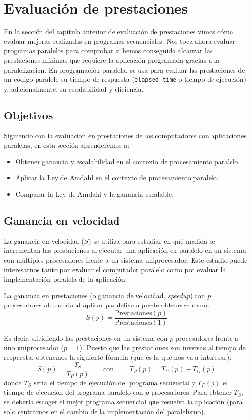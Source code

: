 \newpage
\section{Evaluación de prestaciones}
En la sección del capítulo anterior de evaluación de prestaciones vimos cómo evaluar mejoras realizadas en programas secuenciales. Nos toca ahora evaluar programas paralelos para comprobar si hemos conseguido alcanzar las prestaciones mínimas que requiere la aplicación programada gracias a la paralelización. En programación paralela, se usa para evaluar las prestaciones de un código paralelo su tiempo de respuesta (\verb|elapsed time| o tiempo de ejecución) y, adicionalmente, su escalabilidad y eficiencia.

\subsection{Objetivos}
Siguiendo con la evaluación en prestaciones de los computadores con aplicaciones paralelas, en esta sección aprenderemos a:
\begin{itemize}
    \item Obtener ganancia y escalabilidad en el contexto de procesamiento paralelo.
    \item Aplicar la Ley de Amdahl en el contexto de procesamiento paralelo.
    \item Comparar la Ley de Amdahl y la ganancia escalable.
\end{itemize}

\subsection{Ganancia en velocidad}
La ganancia en velocidad ($S$) se utiliza para estudiar en qué medida se incrementan las prestaciones al ejecutar una aplicación en paralelo en un sistema con múltiples procesadores frente a un sistema uniprocesador. Este estudio puede interesarnos tanto por evaluar el computador paralelo como por evaluar la implementación paralela de la aplicación.

La ganancia en prestaciones (o ganancia de velocidad, \emph{speedup}) con $p$ procesadores alcanzada al aplicar paralelismo puede obtenerse como:
\begin{equation*}
    S(p) = \dfrac{\text{Prestaciones}(p)}{\text{Prestaciones}(1)}
\end{equation*}

Es decir, dividiendo las prestaciones en un sistema con $p$ procesadores frente a uno uniprocesador ($p=1$). Puesto que las prestaciones son inversas al tiempo de respuesta, obtenemos la siguiente fórmula (que es la que nos va a interesar):
\begin{equation}
    S(p) = \dfrac{T_S}{T_P(p)}\qquad \text{con\ }\qquad  T_P(p) = T_C(p) + T_O(p)
\end{equation}
donde $T_S$ sería el tiempo de ejecución del programa secuencial y $T_P(p)$ el tiempo de ejecución del programa paralelo con $p$ procesadores. Para obtener $T_S$, se debería escoger el mejor programa secuencial que resuelva la aplicación (para solo centrarnos en el cambio de la implementación del paralelismo).

